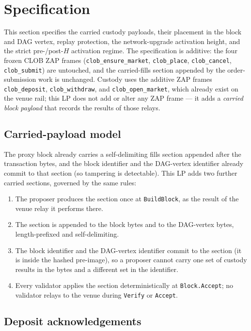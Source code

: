 \section{Specification}
\label{sec:spec}

This section specifies the carried custody payloads, their placement in
the block and DAG vertex, replay protection, the network-upgrade
activation height, and the strict pre-/post-$H$ activation regime. The
specification is additive: the four frozen CLOB ZAP frames
(\texttt{clob\_ensure\_market}, \texttt{clob\_place},
\texttt{clob\_cancel}, \texttt{clob\_submit}) are untouched, and the
carried-fills section appended by the order-submission work is
unchanged. Custody uses the additive ZAP frames
\texttt{clob\_deposit}, \texttt{clob\_withdraw}, and
\texttt{clob\_open\_market}, which already exist on the venue rail; this
LP does not add or alter any ZAP frame --- it adds a \emph{carried
block payload} that records the results of those relays.

\subsection{Carried-payload model}

The proxy block already carries a self-delimiting fills section
appended after the transaction bytes, and the block identifier and the
DAG-vertex identifier already commit to that section (so tampering is
detectable). This LP adds two further carried sections, governed by the
same rules:

\begin{enumerate}[leftmargin=2em,nosep]
\item The proposer produces the section once at \texttt{BuildBlock}, as
  the result of the venue relay it performs there.
\item The section is appended to the block bytes and to the DAG-vertex
  bytes, length-prefixed and self-delimiting.
\item The block identifier and the DAG-vertex identifier commit to the
  section (it is inside the hashed pre-image), so a proposer cannot
  carry one set of custody results in the bytes and a different set in
  the identifier.
\item Every validator applies the section deterministically at
  \texttt{Block.Accept}; no validator relays to the venue during
  \texttt{Verify} or \texttt{Accept}.
\end{enumerate}

\subsection{Deposit acknowledgements}

